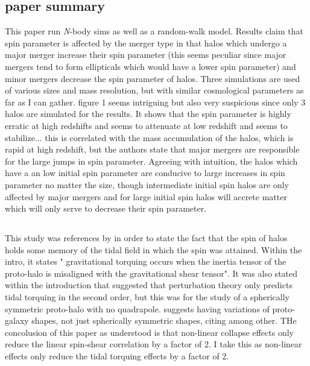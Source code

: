 \documentclass[fleqn,usenatbib]{mnras}
\begin{document}
\subsection{paper summary}
This paper run \textit{N}-body sims as well as a random-walk model. Results claim that spin parameter is affected by the merger type in that halos which undergo a major merger increase their spin parameter (this seems peculiar since major mergers tend to form ellipticals which would have a lower spin parameter) and minor mergers decrease the spin parameter of halos.
Three simulations are used of various sizes and mass resolution, but with similar cosmological parameters as far as I can gather.
figure 1 seems intriguing but also very suspicious since only 3 halos are simulated for the results. It shows that the spin parameter is highly erratic at high redshifts and seems to attenuate at low redshift and seems to stabilize... this is correlated with the mass accumulation of the halos, which is rapid at high redshift, but the authors state that major mergers are responsible for the large jumps in spin parameter. Agreeing with intuition, the halos which have a an low initial spin parameter are conducive to large increases in spin parameter no matter the size, though intermediate initial spin halos are only affected by major mergers and for large initial spin halos will accrete matter which will only serve to decrease their spin parameter.

\subsection{\citet{Lee_pen_00}}

This study was references by \citet{Trowland_13} in order to state the fact that the spin of halos holds some memory of the tidal field in which the spin was attained.
Within the intro, it states " gravitational torquing occurs when the inertia tensor of the proto-halo is misaligned with the gravitational shear tensor". It was also stated within the introduction that \citet{Peebles_69} suggested that perturbation theory only predicts tidal torquing in the second order, but this was for the study of a spherically symmetric proto-halo with no quadrapole. \citet{Lee_pen_00} suggests having variations of proto-galaxy shapes, not just spherically symmetric shapes, citing \citet{White84} among other. THe concolusion of this paper as understood is that non-linear collapse effects only reduce the linear spin-shear correlation by a factor of 2. I take this as non-linear effects only reduce the tidal torquing effects by a factor of 2.
\end{document}
